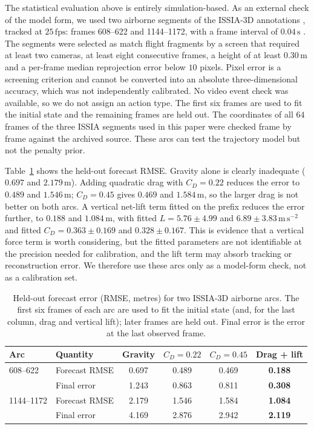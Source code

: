 \documentclass[11pt,a4paper]{article}
\begin{document}
The statistical evaluation above is entirely simulation-based. As an external check of the model form, we used two airborne segments of the ISSIA-3D annotations \cite{soccernetv3d}, tracked at $25\,\mathrm{fps}$: frames 608--622 and 1144--1172, with a frame interval of $0.04\,\mathrm{s}$ \cite{issia}. The segments were selected as match flight fragments by a screen that required at least two cameras, at least eight consecutive frames, a height of at least $0.30\,\mathrm{m}$ and a per-frame median reprojection error below $10$ pixels. Pixel error is a screening criterion and cannot be converted into an absolute three-dimensional accuracy, which was not independently calibrated. No video event check was available, so we do not assign an action type. The first six frames are used to fit the initial state and the remaining frames are held out. The coordinates of all $64$ frames of the three ISSIA segments used in this paper were checked frame by frame against the archived source. These arcs can test the trajectory model but not the penalty prior.

Table~\ref{tab:issia} shows the held-out forecast RMSE. Gravity alone is clearly inadequate ($0.697$ and $2.179\,\mathrm{m}$). Adding quadratic drag with $C_D=0.22$ reduces the error to $0.489$ and $1.546\,\mathrm{m}$; $C_D=0.45$ gives $0.469$ and $1.584\,\mathrm{m}$, so the larger drag is not better on both arcs. A vertical net-lift term fitted on the prefix reduces the error further, to $0.188$ and $1.084\,\mathrm{m}$, with fitted $L=5.76\pm4.99$ and $6.89\pm3.83\,\mathrm{m\,s^{-2}}$ and fitted $C_D=0.363\pm0.169$ and $0.328\pm0.167$. This is evidence that a vertical force term is worth considering, but the fitted parameters are not identifiable at the precision needed for calibration, and the lift term may absorb tracking or reconstruction error. We therefore use these arcs only as a model-form check, not as a calibration set.

\begin{table}[htbp]
  \centering
  \caption{Held-out forecast error (RMSE, metres) for two ISSIA-3D airborne arcs. The first six frames of each arc are used to fit the initial state (and, for the last column, drag and vertical lift); later frames are held out. Final error is the error at the last observed frame.}
  \label{tab:issia}
  \begin{tabular}{llcccc}
    \toprule
    Arc & Quantity & Gravity & $C_D=0.22$ & $C_D=0.45$ & Drag + lift \\
    \midrule
    608--622 & Forecast RMSE & 0.697 & 0.489 & 0.469 & \textbf{0.188} \\
             & Final error   & 1.243 & 0.863 & 0.811 & \textbf{0.308} \\
    1144--1172 & Forecast RMSE & 2.179 & 1.546 & 1.584 & \textbf{1.084} \\
               & Final error   & 4.169 & 2.876 & 2.942 & \textbf{2.119} \\
    \bottomrule
  \end{tabular}
\end{table}
\end{document}
